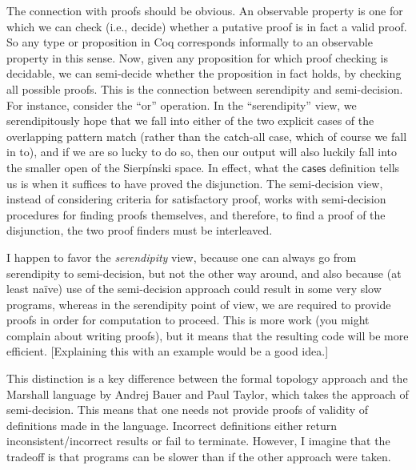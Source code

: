 The connection with proofs should be obvious. An observable property is one for which we can check (i.e., decide) whether a putative proof is in fact a valid proof. So any type or proposition in Coq corresponds informally to an observable property in this sense. Now, given any proposition for which proof checking is decidable, we can semi-decide whether the proposition in fact holds, by checking all possible proofs. This is the connection between serendipity and semi-decision. For instance, consider the ``or'' operation. In the ``serendipity'' view, we serendipitously hope that we fall into either of the two explicit cases of the overlapping pattern match (rather than the catch-all case, which of course we fall in to), and if we are so lucky to do so, then our output will also luckily fall into the smaller open of the Sierpínski space. In effect, what the $\mathsf{cases}$ definition tells us is when it suffices to have proved the disjunction. The semi-decision view, instead of considering criteria for satisfactory proof, works with semi-decision procedures for finding proofs themselves, and therefore, to find a proof of the disjunction, the two proof finders must be interleaved.

I happen to favor the \emph{serendipity} view, because one can always go from serendipity to semi-decision, but not the other way around, and also because (at least naïve) use of the semi-decision approach could result in some very slow programs, whereas in the serendipity point of view, we are required to provide proofs in order for computation to proceed. This is more work (you might complain about writing proofs), but it means that the resulting code will be more efficient. [Explaining this with an example would be a good idea.]

This distinction is a key difference between the formal topology approach and the Marshall language by Andrej Bauer and Paul Taylor, which takes the approach of semi-decision. This means that one needs not provide proofs of validity of definitions made in the language. Incorrect definitions either return inconsistent/incorrect results or fail to terminate. However, I imagine that the tradeoff is that programs can be slower than if the other approach were taken.


